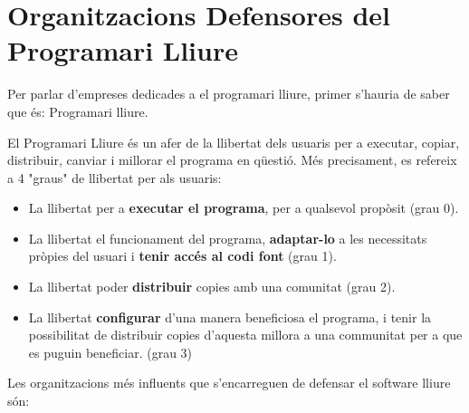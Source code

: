 \section{Organitzacions Defensores del Programari Lliure}

Per parlar d'empreses dedicades a el programari lliure, primer s'hauria de saber que és: Programari lliure.

	\item El Programari Lliure és un afer de la llibertat dels usuaris per a executar, copiar, 		distribuir, canviar i millorar el programa en qüestió. Més precisament, es refereix a 4 "graus" de 		llibertat per als usuaris:

	\begin{itemize}
		\item La llibertat per a \textbf{executar el programa}, per a qualsevol propòsit (grau  0).
		\item La llibertat  el funcionament del programa, \textbf{adaptar-lo} a les 			necessitats pròpies del usuari i \textbf{tenir accés al codi font} (grau 1).
		\item La llibertat poder \textbf{distribuir} copies amb una comunitat (grau 2).
		\item La llibertat \textbf{configurar} d'una manera beneficiosa el programa, i tenir la 		possibilitat de	distribuir copies d'aquesta millora a una communitat per a que es puguin 			beneficiar. (grau 3)
	\end{itemize}
Les organitzacions més influents que s'encarreguen de defensar el software lliure són:
 
